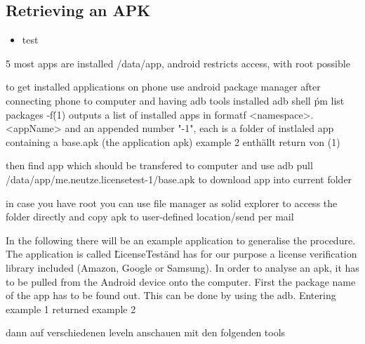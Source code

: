\subsection{Retrieving an APK} \label{subsection:tools-apk}
\begin{itemize}
    \item test
\end{itemize}
5
most apps are installed /data/app, android restricts access, with root possible

to get installed applications on phone use android package manager
after connecting phone to computer and having \gls{adb} tools installed
adb shell \'pm list packages -f\' (1)
outputs a list of installed apps in formatf <namespace>.<appName> and an appended number "-1", each is a folder of instlaled app containing a base.apk (the application apk)
example 2 enthällt return von (1)

then find app which should be transfered to computer and use
adb pull /data/app/me.neutze.licensetest-1/base.apk
to download app into current folder

in case you have root you can use file manager as solid explorer to access the folder directly and copy apk to user-defined location/send per mail


\cite{munteanLicense}
%

In the following there will be an example application to generalise the procedure. The application is called \"LicenseTest\" and has for our purpose a license verification library included (Amazon, Google or Samsung).\newline
In order to analyse an \gls{apk}, it has to be pulled from the Android device onto the computer. First the package name of the app has to be found out. This can be done by using the \gls{adb}. Entering example 1 returned example 2

dann auf verschiedenen leveln anschauen mit den folgenden tools
